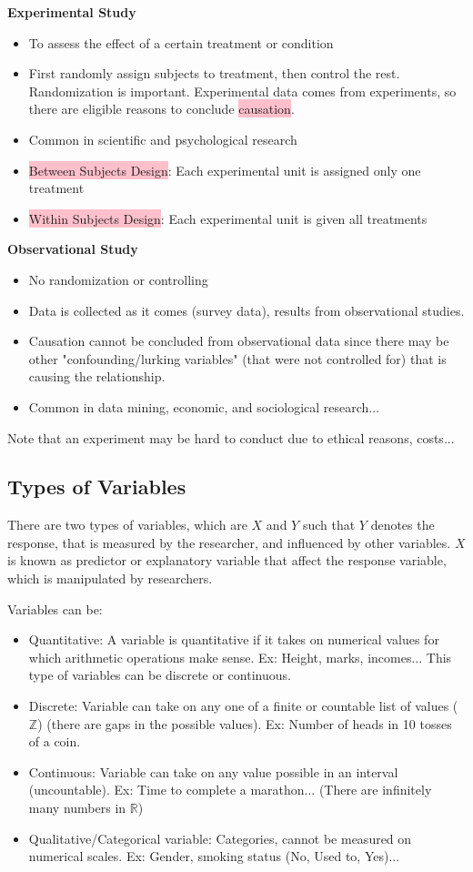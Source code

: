 \documentclass[a4paper,11pt]{article}
\newcommand{\R}{\mathbb{R}}
\newcommand{\Z}{\mathbb{Z}}
\begin{document}
\textbf{Experimental Study}
\begin{itemize}
\item To assess the effect of a certain treatment or condition
\item First randomly assign subjects to treatment, then control the rest. Randomization is important. Experimental data comes from experiments, so there are eligible reasons to conclude \colorbox{pink}{causation}. 
\item Common in scientific and psychological research
\item \colorbox{pink}{Between Subjects Design}: Each experimental unit is assigned only one treatment
\item \colorbox{pink}{Within Subjects Design}: Each experimental unit is given all treatments
\end{itemize}
\textbf{Observational Study}
\begin{itemize}
\item No randomization or controlling
\item Data is collected as it comes (survey data), results from observational studies. 
\item Causation cannot be concluded from observational data since there may be other "confounding/lurking variables" (that were not controlled for) that is causing the relationship. 
\item Common in data mining, economic, and sociological research... 
\end{itemize}
Note that an experiment may be hard to conduct due to ethical reasons, costs... 
\subsection{Types of Variables}
There are two types of variables, which are $X$ and $Y$ such that $Y$ denotes the response, that is measured by the researcher, and influenced by other variables. $X$ is known as predictor or explanatory variable that affect the response variable, which is manipulated by researchers. 

Variables can be:
\begin{itemize}
\item Quantitative: A variable is quantitative if it takes on numerical values for which arithmetic operations make sense. Ex: Height, marks, incomes... This type of variables can be discrete or continuous. 
\item Discrete: Variable can take on any one of a finite or countable list of values ($\Z$) (there are gaps in the possible values). Ex: Number of heads in 10 tosses of a coin. 
\item Continuous: Variable can take on any value possible in an interval (uncountable). Ex: Time to complete a marathon... (There are infinitely many numbers in $\R$)
\item Qualitative/Categorical variable: Categories, cannot be measured on numerical scales. Ex: Gender, smoking status (No, Used to, Yes)... 
\end{itemize}
\end{document}
